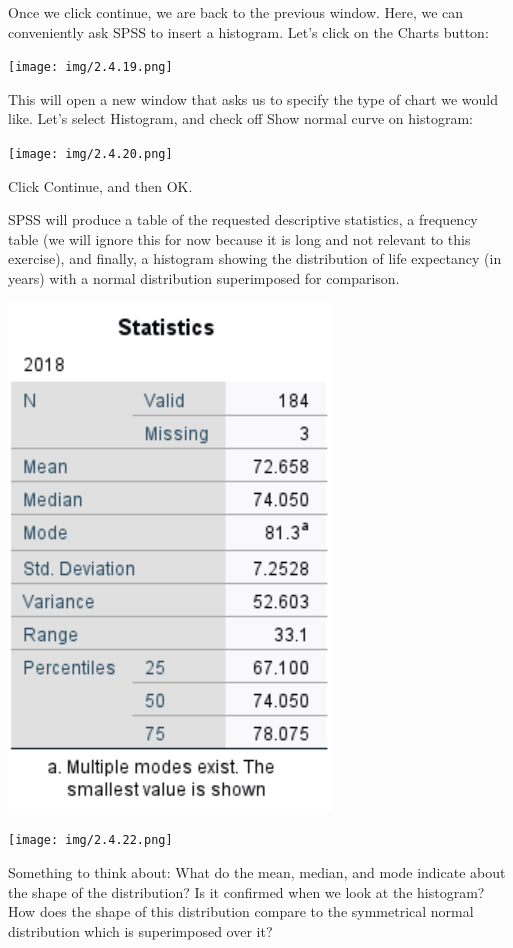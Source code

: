\documentclass[]{book}
\begin{document}
Once we click continue, we are back to the previous window. Here, we can
conveniently ask SPSS to insert a histogram. Let's click on the {Charts}
button:

\texttt{[image: img/2.4.19.png]}

This will open a new window that asks us to specify the type of chart we
would like. Let's select {Histogram}, and check off {Show normal curve
on histogram}:

\texttt{[image: img/2.4.20.png]}

Click {Continue}, and then {OK}.

SPSS will produce a table of the requested descriptive statistics, a
frequency table (we will ignore this for now because it is long and not
relevant to this exercise), and finally, a histogram showing the
distribution of life expectancy (in years) with a normal distribution
superimposed for comparison.

\includegraphics{img/2.4.21.png}

\texttt{[image: img/2.4.22.png]}

Something to think about: What do the mean, median, and mode indicate
about the shape of the distribution? Is it confirmed when we look at the
histogram? How does the shape of this distribution compare to the
symmetrical normal distribution which is superimposed over it?
\end{document}
